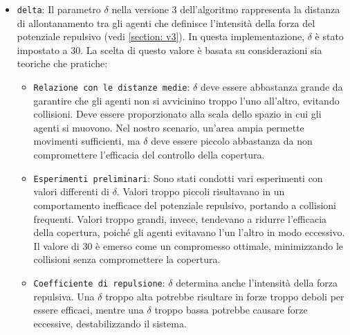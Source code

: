 \documentclass[twoside]{article}
\begin{document}
\begin{itemize}
\begin{itemize}
        \item \verb|Selezione|: La scelta del valore di \(\epsilon\) è fondamentale e spesso viene determinata attraverso esperimenti e tuning specifici per il problema in questione. In molti casi, un valore medio che bilancia la velocità di convergenza e la stabilità è preferibile. In alcuni approcci avanzati, \(\epsilon\) può essere adattivo, variando dinamicamente durante l'esecuzione dell'algoritmo per ottimizzare il processo di apprendimento.
    \end{itemize}
    Nel progetto, il passo di salita \(\epsilon\) è stato impostato a 150. Questa scelta è stata effettuata dopo aver effettuato varie prove con valori più piccoli e più grandi. Si è notato che un valore di 150 rappresenta il miglior compromesso per evitare sia la convergenza troppo lenta che l'oscillazione attorno al punto di massimo.

    \item \verb|delta|: Il parametro \(\delta\) nella versione 3 dell'algoritmo rappresenta la distanza di allontanamento tra gli agenti che definisce l'intensità della forza del potenziale repulsivo (vedi \ref{section: v3}). In questa implementazione, \(\delta\) è stato impostato a 30. La scelta di questo valore è basata su considerazioni sia teoriche che pratiche:
    \begin{itemize}
        \item \verb|Relazione con le distanze medie|:
        \(\delta\) deve essere abbastanza grande da garantire che gli agenti non si avvicinino troppo l'uno all'altro, evitando collisioni. Deve essere proporzionato alla scala dello spazio in cui gli agenti si muovono. Nel nostro scenario, un'area ampia permette movimenti sufficienti, ma \(\delta\) deve essere piccolo abbastanza da non compromettere l'efficacia del controllo della copertura.
        
        \item \verb|Esperimenti preliminari|:
        Sono stati condotti vari esperimenti con valori differenti di \(\delta\). Valori troppo piccoli risultavano in un comportamento inefficace del potenziale repulsivo, portando a collisioni frequenti. Valori troppo grandi, invece, tendevano a ridurre l'efficacia della copertura, poiché gli agenti evitavano l'un l'altro in modo eccessivo. Il valore di 30 è emerso come un compromesso ottimale, minimizzando le collisioni senza compromettere la copertura.
        
        \item \verb|Coefficiente di repulsione|:
        \(\delta\) determina anche l'intensità della forza repulsiva. Una \(\delta\) troppo alta potrebbe risultare in forze troppo deboli per essere efficaci, mentre una \(\delta\) troppo bassa potrebbe causare forze eccessive, destabilizzando il sistema.
    \end{itemize}
\end{itemize}
\end{document}
